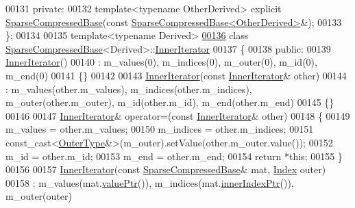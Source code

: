 \begin{DoxyCode}
00131   \textcolor{keyword}{private}:
00132     \textcolor{keyword}{template}<\textcolor{keyword}{typename} OtherDerived> \textcolor{keyword}{explicit} \hyperlink{group___sparse_core___module_class_eigen_1_1_sparse_compressed_base}{SparseCompressedBase}(\textcolor{keyword}{const} 
      \hyperlink{group___sparse_core___module_class_eigen_1_1_sparse_compressed_base}{SparseCompressedBase<OtherDerived>}&);
00133 \};
00134 
00135 \textcolor{keyword}{template}<\textcolor{keyword}{typename} Derived>
\hyperlink{class_eigen_1_1_sparse_compressed_base_1_1_inner_iterator}{00136} \textcolor{keyword}{class }\hyperlink{group___sparse_core___module_class_eigen_1_1_sparse_compressed_base}{SparseCompressedBase}<Derived>::\hyperlink{class_eigen_1_1_sparse_compressed_base_1_1_inner_iterator}{InnerIterator}
00137 \{
00138   \textcolor{keyword}{public}:
00139     \hyperlink{class_eigen_1_1_sparse_compressed_base_1_1_inner_iterator}{InnerIterator}()
00140       : m\_values(0), m\_indices(0), m\_outer(0), m\_id(0), m\_end(0)
00141     \{\}
00142 
00143     \hyperlink{class_eigen_1_1_sparse_compressed_base_1_1_inner_iterator}{InnerIterator}(\textcolor{keyword}{const} \hyperlink{class_eigen_1_1_sparse_compressed_base_1_1_inner_iterator}{InnerIterator}& other)
00144       : m\_values(other.m\_values), m\_indices(other.m\_indices), m\_outer(other.m\_outer), m\_id(other.m\_id), 
      m\_end(other.m\_end)
00145     \{\}
00146 
00147     \hyperlink{class_eigen_1_1_sparse_compressed_base_1_1_inner_iterator}{InnerIterator}& operator=(\textcolor{keyword}{const} \hyperlink{class_eigen_1_1_sparse_compressed_base_1_1_inner_iterator}{InnerIterator}& other)
00148     \{
00149       m\_values = other.m\_values;
00150       m\_indices = other.m\_indices;
00151       \textcolor{keyword}{const\_cast<}\hyperlink{class_eigen_1_1internal_1_1variable__if__dynamic}{OuterType}&\textcolor{keyword}{>}(m\_outer).setValue(other.m\_outer.value());
00152       m\_id = other.m\_id;
00153       m\_end = other.m\_end;
00154       \textcolor{keywordflow}{return} *\textcolor{keyword}{this};
00155     \}
00156 
00157     \hyperlink{class_eigen_1_1_sparse_compressed_base_1_1_inner_iterator}{InnerIterator}(\textcolor{keyword}{const} \hyperlink{group___sparse_core___module_class_eigen_1_1_sparse_compressed_base}{SparseCompressedBase}& mat, 
      \hyperlink{group___core___module_a554f30542cc2316add4b1ea0a492ff02}{Index} outer)
00158       : m\_values(mat.\hyperlink{group___sparse_core___module_a0f44c739398794ea77f310b745cc5627}{valuePtr}()), m\_indices(mat.\hyperlink{group___sparse_core___module_aa64818e1aa43015dad01b114b2ab4687}{innerIndexPtr}()), m\_outer(outer)

\end{DoxyCode}
